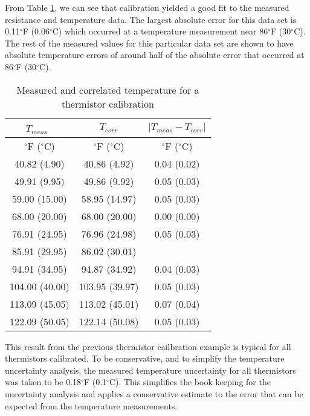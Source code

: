 From Table \ref{tab:ExpMethod:Instr:TempCal:CalDataCompare}, we can see that calibration yielded a good fit to the measured resistance and temperature data. The largest absolute error for this data set is 0.11$^\circ$F (0.06$^\circ$C) which occurred at a temperature measurement near 86$^\circ$F (30$^\circ$C). The rest of the measured values for this particular data set are shown to have absolute temperature errors of around half of the absolute error that occurred at 86$^\circ$F (30$^\circ$C).

\begin{table}[h]
	\centering
	\caption{Measured and correlated temperature for a thermistor calibration}
	\label{tab:ExpMethod:Instr:TempCal:CalDataCompare}
	\begin{tabular}{c | c | c}
	\hline
	$T_{meas}$\ & $T_{corr}$ & $|T_{meas} - T_{corr}|$ \\
	\hline
	$^\circ$F ($^\circ$C) & $^\circ$F ($^\circ$C) & $^\circ$F ($^\circ$C)\\
	\hline\hline
	40.82 (4.90) & 40.86 (4.92) & 0.04 (0.02) \\
	\hline
	49.91 (9.95) & 49.86 (9.92) & 0.05 (0.03) \\
	\hline
	59.00 (15.00) & 58.95 (14.97) & 0.05 (0.03) \\
	\hline
	68.00 (20.00) & 68.00 (20.00) &  0.00 (0.00) \\
	\hline
	76.91 (24.95) & 76.96 (24.98) & 0.05 (0.03) \\
	\hline
	85.91 (29.95) & 86.02 (30.01) & \color{red}{0.11 (0.06)} \\
	\hline
	94.91 (34.95) & 94.87 (34.92) & 0.04 (0.03) \\
	\hline
	104.00 (40.00) & 103.95 (39.97) & 0.05 (0.03) \\
	\hline
	113.09 (45.05) & 113.02 (45.01) & 0.07 (0.04) \\
	\hline
	122.09 (50.05) & 122.14 (50.08) & 0.05 (0.03) \\
	\hline
	\end{tabular}
\end{table}

This result from the previous thermistor cailbration example is typical for all thermistors calibrated. To be conservative, and to simplify the temperature uncertainty analysis, the measured temperature uncertainty for all thermistors was taken to be 0.18$^\circ$F (0.1$^\circ$C). This simplifies the book keeping for the uncertainty analysis and applies a conservative estimate to the error that can be expected from the temperature measurements.

